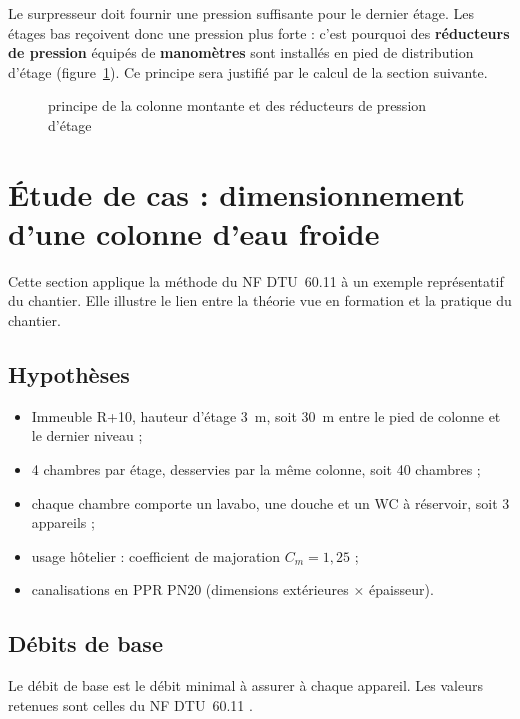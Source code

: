 Le surpresseur doit fournir une pression suffisante pour le dernier étage. Les étages bas
reçoivent donc une pression plus forte : c'est pourquoi des \textbf{réducteurs de pression}
équipés de \textbf{manomètres} sont installés en pied de distribution d'étage
(figure~\ref{fig:colonne}). Ce principe sera justifié par le calcul de la section suivante.

\begin{figure}[H]\centering

\caption{principe de la colonne montante et des réducteurs de pression d'étage}\label{fig:colonne}
\end{figure}

\section{Étude de cas : dimensionnement d'une colonne d'eau froide}

Cette section applique la méthode du NF DTU~60.11 \cite{dtu6011} à un exemple représentatif du
chantier. Elle illustre le lien entre la théorie vue en formation et la pratique du chantier.

\subsection{Hypothèses}
\begin{itemize}
  \item Immeuble R+10, hauteur d'étage \SI{3}{\metre}, soit \SI{30}{\metre} entre le pied de
        colonne et le dernier niveau ;
  \item 4 chambres par étage, desservies par la même colonne, soit 40 chambres ;
  \item chaque chambre comporte un lavabo, une douche et un WC à réservoir, soit 3 appareils ;
  \item usage hôtelier : coefficient de majoration $C_m = 1{,}25$ \cite{caleffiReducteurs,xpairDebit} ;
  \item canalisations en PPR PN20 (dimensions extérieures × épaisseur).
\end{itemize}

\subsection{Débits de base}
Le débit de base est le débit minimal à assurer à chaque appareil. Les valeurs retenues sont
celles du NF DTU~60.11 \cite{dtu6011,clageDebits,caleffiDebits}.

